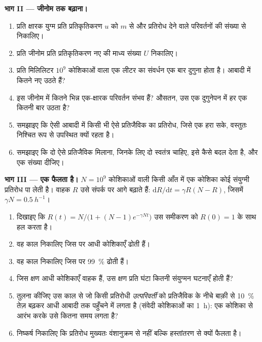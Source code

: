 \begin{problem}
\medskip
\noindent\textbf{भाग II --- जीनोम तक बढ़ाना।}
\begin{enumerate}[resume]
  \item प्रति क्षारक युग्म प्रति प्रतिकृतिकरण  $u$ को
        $m$ से और प्रतिरोध देने वाले परिवर्तनों की संख्या से निकालिए।
  \item प्रति जीनोम प्रति प्रतिकृतिकरण नए  की माध्य
        संख्या $U$ निकालिए।
  \item प्रति मिलिलिटर $10^{9}$ कोशिकाओं वाला एक लीटर का संवर्धन एक
        बार दुगुना होता है। आबादी में कितने नए  उठते हैं?
  \item इस जीनोम में कितने भिन्न एक-क्षारक परिवर्तन संभव हैं? औसतन, उस
        एक दुगुनेपन में हर एक कितनी बार उठता है?
  \item समझाइए कि ऐसी आबादी में किसी भी ऐसे प्रतिजैविक का प्रतिरोध,
        जिसे एक  हरा सके, वस्तुतः निश्चित रूप से उपस्थित
        क्यों रहता है।
  \item समझाइए कि दो ऐसे प्रतिजैविक मिलाना, जिनके लिए दो स्वतंत्र
         चाहिए, इसे कैसे बदल देता है, और एक संख्या दीजिए।
\end{enumerate}

\medskip
\noindent\textbf{भाग III --- एक  फैलता है।}
$N = 10^{9}$ कोशिकाओं वाली किसी आँत में एक कोशिका कोई संयुग्मी
प्रतिरोध  पा लेती है। वाहक $R$ उसे संपर्क पर आगे बढ़ाते हैं:
$\mathrm{d}R/\mathrm{d}t = \gamma R(N - R)$, जिसमें $\gamma N =
\qty{0.5}{h^{-1}}$।
\begin{enumerate}[resume]
  \item दिखाइए कि $R(t) = N/\bigl(1 + (N - 1)e^{-\gamma N t}\bigr)$
        उस समीकरण को $R(0) = 1$ के साथ हल करता है।
  \item वह काल निकालिए जिस पर आधी कोशिकाएँ  ढोती हैं।
  \item वह काल निकालिए जिस पर \qty{99}{\%} ढोती हैं।
  \item जिस क्षण आधी कोशिकाएँ वाहक हैं, उस क्षण प्रति घंटा कितनी
        संयुग्मन घटनाएँ होती हैं?
  \item तुलना कीजिए उस काल से जो किसी प्रतिरोधी \emph{उत्परिवर्ती} को
        प्रतिजैविक के नीचे बाक़ी से \qty{10}{\%} तेज़ बढ़कर आधी आबादी
        तक पहुँचने में लगता है (संवेदी कोशिकाओं का 
        \qty{1}{h}): एक कोशिका से आरंभ करके उसे कितना समय लगता है?
  \item निष्कर्ष निकालिए कि प्रतिरोध मुख्यतः वंशानुक्रम से नहीं बल्कि
        हस्तांतरण से क्यों फैलता है।
\end{enumerate}


\end{problem}
